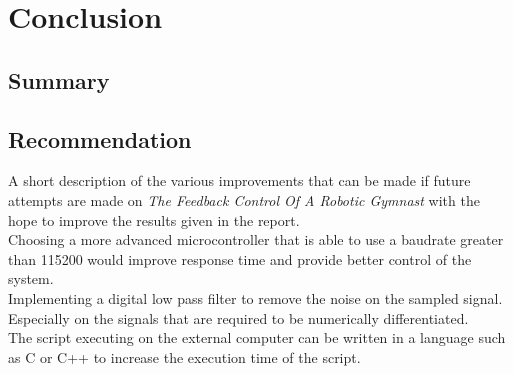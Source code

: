 \chapter{Conclusion}
\label{chp:conclusion}



\section{Summary}

\section{Recommendation}
A short description of the various improvements that can be made if future attempts are made on \textit{The Feedback Control Of A Robotic Gymnast} with the hope to improve the results given in the report.\\

Choosing a more advanced microcontroller that is able to use a baudrate greater than 115200 would improve response time and provide better control of the system.\\

Implementing a digital low pass filter to remove the noise on the sampled signal. Especially on the signals that are required to be numerically differentiated.\\

The script executing on the external computer can be written in a language such as C or C++ to increase the execution time of the script.\\





